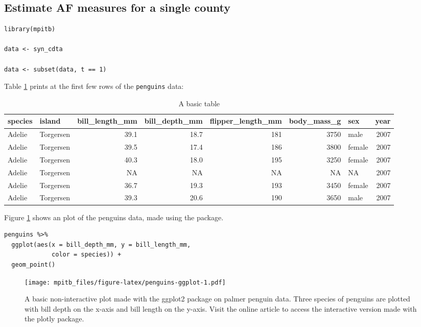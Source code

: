 \hypertarget{estimate-af-measures-for-a-single-county}{%
\subsection{Estimate AF measures for a single county}\label{estimate-af-measures-for-a-single-county}}

\begin{verbatim}
library(mpitb)

data <- syn_cdta

data <- subset(data, t == 1)
\end{verbatim}

Table \ref{tab:penguins-tab-static} prints at the first few rows of the \texttt{penguins} data:

\begin{table}

\caption{\label{tab:penguins-tab-static}A basic table}
\centering
\fontsize{7}{9}\selectfont
\begin{tabular}[t]{l|l|r|r|r|r|l|r}
\hline
species & island & bill\_length\_mm & bill\_depth\_mm & flipper\_length\_mm & body\_mass\_g & sex & year\\
\hline
Adelie & Torgersen & 39.1 & 18.7 & 181 & 3750 & male & 2007\\
\hline
Adelie & Torgersen & 39.5 & 17.4 & 186 & 3800 & female & 2007\\
\hline
Adelie & Torgersen & 40.3 & 18.0 & 195 & 3250 & female & 2007\\
\hline
Adelie & Torgersen & NA & NA & NA & NA & NA & 2007\\
\hline
Adelie & Torgersen & 36.7 & 19.3 & 193 & 3450 & female & 2007\\
\hline
Adelie & Torgersen & 39.3 & 20.6 & 190 & 3650 & male & 2007\\
\hline
\end{tabular}
\end{table}

Figure \ref{fig:penguins-ggplot} shows an plot of the penguins data, made using the  package.

\begin{verbatim}
penguins %>% 
  ggplot(aes(x = bill_depth_mm, y = bill_length_mm, 
             color = species)) + 
  geom_point()
\end{verbatim}

\begin{figure}
\centering
\texttt{[image: mpitb\_files/figure-latex/penguins-ggplot-1.pdf]}
\caption{\label{fig:penguins-ggplot}A basic non-interactive plot made with the ggplot2 package on palmer penguin data. Three species of penguins are plotted with bill depth on the x-axis and bill length on the y-axis. Visit the online article to access the interactive version made with the plotly package.}
\end{figure}

